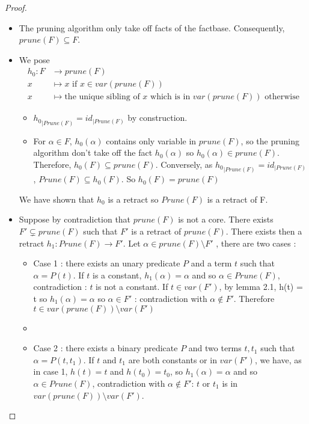 \documentclass{article}
\theoremstyle{definition}
\theoremstyle{remark}
\begin{document}
\begin{proof}
\begin{itemize}
\item The pruning algorithm only take off facts of the factbase. Consequently, $prune(F) \subseteq F$.
\item We pose
\begin{align*}
h_0:F &\to prune(F)\\
x &\mapsto x \text{ if }x \in var(prune(F))\\
x &\mapsto \text{the unique sibling of }x\text{ which is in } var(prune(F))\text{ otherwise}
\end{align*}
\begin{itemize}
\item ${h_0}_{|Prune(F)}=id_{|Prune(F)}$ by construction.
\item For $\alpha \in F$, $h_0(\alpha)$ contains only variable in $prune(F)$, so the pruning algorithm don't take off the fact $h_0(\alpha)$ so $h_0(\alpha) \in prune(F)$. Therefore, $h_0(F) \subseteq prune(F)$. Conversely, as ${h_0}_{|Prune(F)}=id_{|Prune(F)}$, $Prune(F) \subseteq h_0(F)$. So $h_0(F) = prune(F)$
\end{itemize}
We have shown that $h_0$ is a retract so $Prune(F)$ is a retract of F.
\item Suppose by contradiction that $prune(F)$ is not a core. There exists $F' \subsetneq prune(F)$ such that $F'$ is a retract of $prune(F)$. There exists then a retract $h_1: Prune(F) \to F'$.  Let $\alpha \in prune(F)\setminus F'$ , there are two cases :
\begin{itemize}
\item Case 1 : there exists an unary predicate $P$ and a term $t$ such that $\alpha = P(t)$. If $t$ is a constant, $h_1(\alpha) = \alpha$ and so $\alpha \in Prune(F)$, contradiction : $t$ is not a constant. If $t \in var(F')$, by lemma 2.1, h(t) = t so $h_1(\alpha) = \alpha$ so $\alpha \in F'$ : contradiction with $\alpha \notin F'$. Therefore $t \in var(prune(F))\setminus var(F')$
\item \item Case 2 : there exists a binary predicate $P$ and two terms $t,t_1$ such that $\alpha = P(t,t_1)$. If $t$ and $t_1$ are both constants or in $var(F')$, we have, as in case 1, $h(t) = t$ and $h(t_0) = t_0$, so $h_1(\alpha) = \alpha$ and so $\alpha \in Prune(F)$, contradiction with $\alpha \notin F'$: $t$ or $t_1$ is in $var(prune(F))\setminus var(F')$.
\end{itemize}

\end{itemize}
\end{proof}
\end{document}
